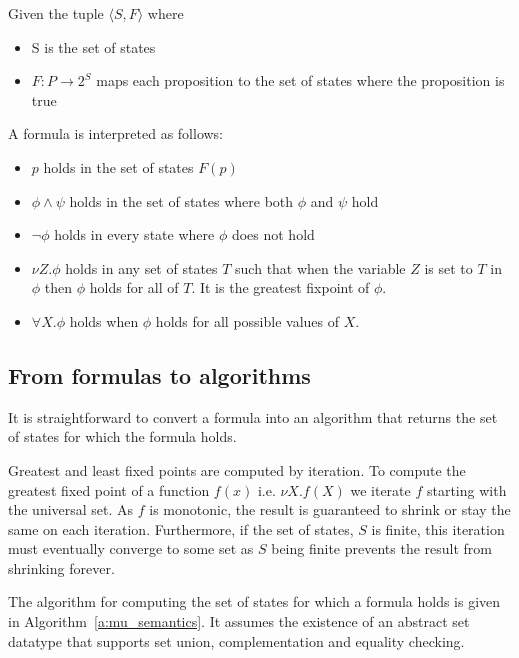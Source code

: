 Given the tuple $\langle S, F \rangle$ where
\begin{itemize}
    \item S is the set of states
    \item $F : P \rightarrow 2^S$ maps each proposition to the set of states where the proposition is true
\end{itemize}

\noindent A \mucalc formula is interpreted as follows:
\begin{itemize}
    \item $p$ holds in the set of states $F(p)$
    \item $\phi \wedge \psi$ holds in the set of states where both $\phi$ and $\psi$ hold
    \item $\neg \phi$ holds in every state where $\phi$ does not hold 
    \item $\nu Z. \phi$ holds in any set of states $T$ such that when the variable $Z$ is set to $T$ in $\phi$ then $\phi$ holds for all of $T$. It is the greatest fixpoint of $\phi$.
    \item $\forall X. \phi$ holds when $\phi$ holds for all possible values of $X$.
\end{itemize}

\subsection{From \mucalc formulas to algorithms}

It is straightforward to convert a \mucalc formula into an algorithm that returns the set of states for which the formula holds.

Greatest and least fixed points are computed by iteration. To compute the greatest fixed point of a function $f(x)$ i.e. $\nu X. f(X)$ we iterate $f$ starting with the universal set. As $f$ is monotonic, the result is guaranteed to shrink or stay the same on each iteration. Furthermore, if the set of states, $S$ is finite, this iteration must eventually converge to some set as $S$ being finite prevents the result from shrinking forever. 

The algorithm for computing the set of states for which a \mucalc formula holds is given in Algorithm~\ref{a:mu_semantics}. It assumes the existence of an abstract set datatype that supports set union, complementation and equality checking.

